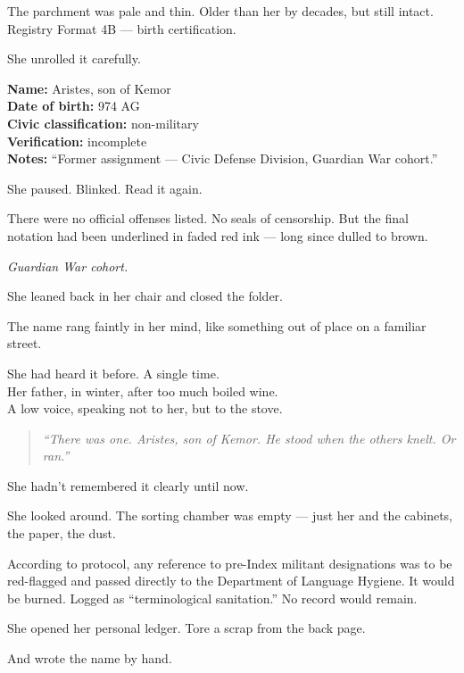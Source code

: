 \documentclass[9pt]{article}
\begin{document}
The parchment was pale and thin. Older than her by decades, but still intact. Registry Format 4B --- birth certification.

She unrolled it carefully.

\textbf{Name:} Aristes, son of Kemor\\
\textbf{Date of birth:} 974 AG\\
\textbf{Civic classification:} non-military\\
\textbf{Verification:} incomplete\\
\textbf{Notes:} “Former assignment --- Civic Defense Division, Guardian War cohort.”

She paused. Blinked. Read it again.

There were no official offenses listed. No seals of censorship. But the final notation had been underlined in faded red ink --- long since dulled to brown.

\textit{Guardian War cohort.}

\vspace{1em}

She leaned back in her chair and closed the folder.

The name rang faintly in her mind, like something out of place on a familiar street.

She had heard it before. A single time.\\
Her father, in winter, after too much boiled wine.\\
A low voice, speaking not to her, but to the stove.

\begin{quote}
\textit{“There was one. Aristes, son of Kemor. He stood when the others knelt. Or ran.”}
\end{quote}

She hadn’t remembered it clearly until now.

She looked around. The sorting chamber was empty --- just her and the cabinets, the paper, the dust.

\vspace{1em}

According to protocol, any reference to pre-Index militant designations was to be red-flagged and passed directly to the Department of Language Hygiene. It would be burned. Logged as “terminological sanitation.” No record would remain.

She opened her personal ledger. Tore a scrap from the back page.

And wrote the name by hand.
\end{document}
